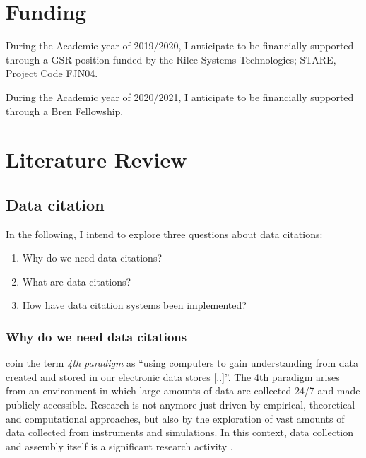 \documentclass[letterpaper, parskip=half]{scrartcl}
\begin{document}
\section{Funding}
During the Academic year of 2019/2020, I anticipate to be financially supported through a GSR position funded by the Rilee Systems Technologies; STARE, Project Code FJN04.

During the Academic year of 2020/2021, I anticipate to be financially supported through a Bren Fellowship.




\newpage
\section{Literature Review}

\subsection{Data citation}
In the following, I intend to explore three questions about data citations:

\begin{enumerate}
 \item Why do we need data citations?
 \item What are data citations?
 \item How have data citation systems been implemented?
\end{enumerate}

\subsubsection{Why do we need data citations}    
\cite{Hey2009} coin the term \textit{4th paradigm} as ``using computers to gain understanding from data created and stored in our electronic data stores [..]''.
The 4th paradigm arises from an environment in which large amounts of data are collected 24/7 and made publicly accessible. Research is not anymore just driven by empirical, theoretical and computational approaches, but also by the exploration of vast amounts of data collected from instruments and simulations. In this context, data collection and assembly itself is a significant research activity \citep{Frew2012}.
\end{document}
